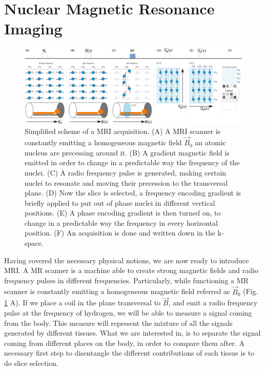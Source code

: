 \section{Nuclear Magnetic Resonance Imaging}

\begin{figure}[t]
    \includegraphics[width=\textwidth]{3.mri/img/mri.png}
    \caption{Simplified scheme of a MRI acquisition. (A) A MRI scanner is constantly
             emitting a homogeneous magnetic field $\vec B_0$ an atomic nucleus
             are precessing around it. (B) A gradient magnetic field is emitted
             in order to change in a predictable way the frequency of the nuclei.
             (C) A radio frequency pulse is generated, making certain nuclei to
             resonate and moving their precession to the transversal plane.
             (D) Now the slice is selected, a frequency encoding gradient is
             briefly applied to put out of phase nuclei in different vertical positions.
             (E) A phase encoding gradient is then turned on, to change in a predictable
             way the frequency in every horizontal position. (F) An acquisition
             is done and written down in the k-space.}
     \label{fig:mri}
\end{figure}

Having covered the necessary physical notions, we are now ready to introduce
MRI. A MR scanner is a machine able to create strong magnetic fields and radio
frequency pulses in different frequencies. Particularly, while functioning
a MR scanner is constantly emitting a homogeneous magnetic field referred as $\vec B_0$
(Fig. \ref{fig:mri} A). If we place a coil in the plane transversal to $\vec B$,
and emit a radio frequency pulse at the frequency of hydrogen, we will be
able to measure a signal coming from the body. This measure will represent the
mixture of all the signals generated by different tissues. What we are interested
in, is to separate the signal coming from different places on the body, in order
to compare them after. A necessary first step to disentangle the different
contributions of each tissue is to do slice selection. 

